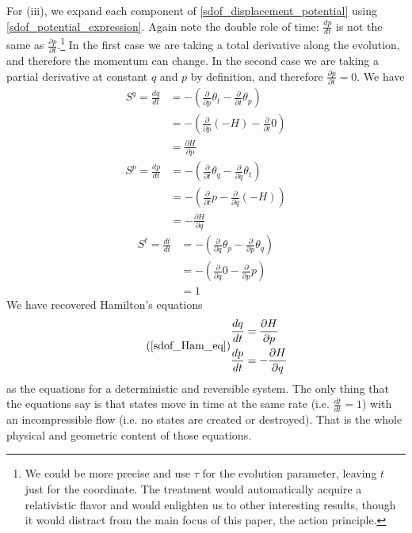\documentclass[10pt,twocolumn, nofootinbib]{revtex4-2}
\begin{document}
For (iii), we expand each component of \ref{sdof_displacement_potential} using \ref{sdof_potential_expression}. Again note the double role of time: $\frac{dp}{dt}$ is not the same as $\frac{\partial p}{\partial t}$.\footnote{We could be more precise and use $\tau$ for the evolution parameter, leaving $t$ just for the coordinate. The treatment would automatically acquire a relativistic flavor and would enlighten us to other interesting results, though it would distract from the main focus of this paper, the action principle. } In the first case we are taking a total derivative along the evolution, and therefore the momentum can change. In the second case we are taking a partial derivative at constant $q$ and $p$ by definition, and therefore $\frac{\partial p}{\partial t}=0$. We have
\begin{equation}
\begin{aligned}
	S^q = \frac{dq}{dt}
	&= - \left( \frac{\partial}{\partial p} \theta_t - \frac{\partial}{\partial t} \theta_p \right) \\
	&= - \left( \frac{\partial}{\partial p} (-H) - \frac{\partial}{\partial t} 0 \right) \\
	& = \frac{\partial H}{\partial p}
\end{aligned}
\end{equation}
\begin{equation}
\begin{aligned}
	S^p = \frac{dp}{dt}
	&= - \left( \frac{\partial}{\partial t} \theta_q - \frac{\partial}{\partial q} \theta_t \right) \\
	&= - \left( \frac{\partial}{\partial t} p - \frac{\partial}{\partial q} (-H) \right) \\
	& = - \frac{\partial H}{\partial q}
\end{aligned}
\end{equation}
\begin{equation}
\begin{aligned}
	S^t = \frac{dt}{dt}
	&= - \left( \frac{\partial}{\partial q} \theta_p - \frac{\partial}{\partial p} \theta_q \right) \\
	&= - \left( \frac{\partial}{\partial q} 0 - \frac{\partial}{\partial p} p \right) \\
	& = 1
\end{aligned}
\end{equation}
We have recovered Hamilton's equations
\begin{equation}
\tag*{(\ref{sdof_Ham_eq})}
\begin{aligned}
	\frac{dq}{dt} &= \frac{\partial H}{\partial p} \\
	\frac{dp}{dt} &=-\frac{\partial H}{\partial q}
\end{aligned}
\end{equation}
as the equations for a deterministic and reversible system. The only thing that the equations say is that states move in time at the same rate (i.e. $\frac{dt}{dt} = 1$) with an incompressible flow (i.e. no states are created or destroyed). That is the whole physical and geometric content of those equations.
\end{document}
